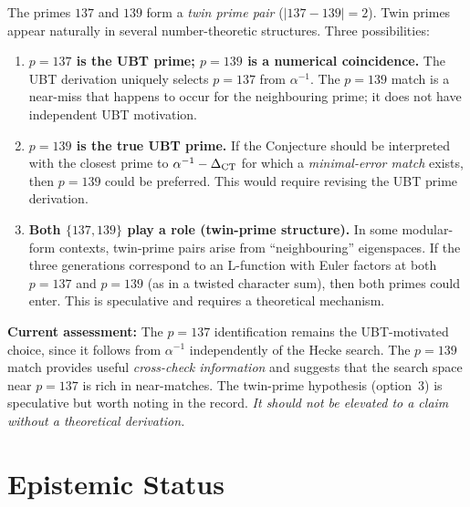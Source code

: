 \documentclass[12pt,a4paper]{article}
\begin{document}
The primes $137$ and $139$ form a \emph{twin prime pair} ($|137 - 139| = 2$).
Twin primes appear naturally in several number-theoretic structures.
Three possibilities:

\begin{enumerate}
  \item \textbf{$p = 137$ is the UBT prime; $p = 139$ is a numerical
    coincidence.}  The UBT derivation uniquely selects $p=137$ from
    $\alpha^{-1}$.  The $p=139$ match is a near-miss that happens to
    occur for the neighbouring prime; it does not have independent UBT
    motivation.

  \item \textbf{$p = 139$ is the true UBT prime.}  If the Conjecture
    should be interpreted with the closest prime to $\alpha^{-1} -
    \Delta_{\rm CT}$ for which a \emph{minimal-error match} exists, then
    $p = 139$ could be preferred.  This would require revising the UBT
    prime derivation.

  \item \textbf{Both $\{137, 139\}$ play a role (twin-prime structure).}
    In some modular-form contexts, twin-prime pairs arise from
    ``neighbouring'' eigenspaces.  If the three generations correspond
    to an L-function with Euler factors at both $p=137$ and $p=139$
    (as in a twisted character sum), then both primes could enter.
    This is speculative and requires a theoretical mechanism.
\end{enumerate}

\noindent \textbf{Current assessment:}
The $p = 137$ identification remains the UBT-motivated choice, since it
follows from $\alpha^{-1}$ independently of the Hecke search.  The
$p = 139$ match provides useful \emph{cross-check information} and
suggests that the search space near $p = 137$ is rich in near-matches.
The twin-prime hypothesis (option~3) is speculative but worth noting in
the record.  \emph{It should not be elevated to a claim without a
theoretical derivation.}

\section{Epistemic Status}
\label{sec:status}
\end{document}
